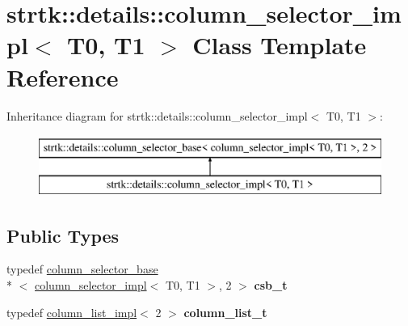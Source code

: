 \hypertarget{classstrtk_1_1details_1_1column__selector__impl_3_01T0_00_01T1_01_4}{\section{strtk\-:\-:details\-:\-:column\-\_\-selector\-\_\-impl$<$ T0, T1 $>$ Class Template Reference}
\label{classstrtk_1_1details_1_1column__selector__impl_3_01T0_00_01T1_01_4}
}
Inheritance diagram for strtk\-:\-:details\-:\-:column\-\_\-selector\-\_\-impl$<$ T0, T1 $>$\-:\begin{figure}[H]
\begin{center}
\leavevmode
\includegraphics[height=2.000000cm]{classstrtk_1_1details_1_1column__selector__impl_3_01T0_00_01T1_01_4}
\end{center}
\end{figure}
\subsection*{Public Types}
\begin{DoxyCompactItemize}
\item 
\hypertarget{classstrtk_1_1details_1_1column__selector__impl_3_01T0_00_01T1_01_4_ab26ab5124cf582c5354420fdab412701}{typedef \hyperlink{classstrtk_1_1details_1_1column__selector__base}{column\-\_\-selector\-\_\-base}\\*
$<$ \hyperlink{classstrtk_1_1details_1_1column__selector__impl}{column\-\_\-selector\-\_\-impl}$<$ T0, T1 $>$, 2 $>$ {\bfseries csb\-\_\-t}}\label{classstrtk_1_1details_1_1column__selector__impl_3_01T0_00_01T1_01_4_ab26ab5124cf582c5354420fdab412701}

\item 
\hypertarget{classstrtk_1_1details_1_1column__selector__impl_3_01T0_00_01T1_01_4_a1bc4b3c49290d68614d9d5055da41e2a}{typedef \hyperlink{structstrtk_1_1details_1_1column__list__impl}{column\-\_\-list\-\_\-impl}$<$ 2 $>$ {\bfseries column\-\_\-list\-\_\-t}}\label{classstrtk_1_1details_1_1column__selector__impl_3_01T0_00_01T1_01_4_a1bc4b3c49290d68614d9d5055da41e2a}

\end{DoxyCompactItemize}
